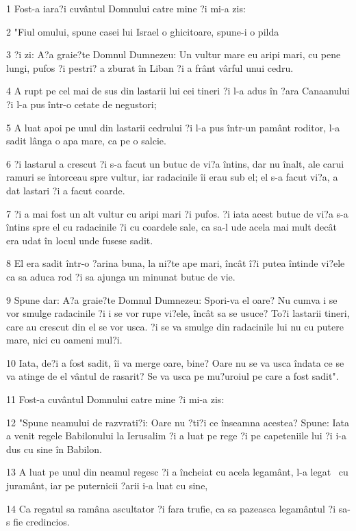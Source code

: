 \par 1 Fost-a iara?i cuvântul Domnului catre mine ?i mi-a zis:
\par 2 "Fiul omului, spune casei lui Israel o ghicitoare, spune-i o pilda
\par 3 ?i zi: A?a graie?te Domnul Dumnezeu: Un vultur mare eu aripi mari, cu pene lungi, pufos ?i pestri? a zburat în Liban ?i a frânt vârful unui cedru.
\par 4 A rupt pe cel mai de sus din lastarii lui cei tineri ?i l-a adus în ?ara Canaanului ?i l-a pus într-o cetate de negustori;
\par 5 A luat apoi pe unul din lastarii cedrului ?i l-a pus într-un pamânt roditor, l-a sadit lânga o apa mare, ca pe o salcie.
\par 6 ?i lastarul a crescut ?i s-a facut un butuc de vi?a întins, dar nu înalt, ale carui ramuri se întorceau spre vultur, iar radacinile îi erau sub el; el s-a facut vi?a, a dat lastari ?i a facut coarde.
\par 7 ?i a mai fost un alt vultur cu aripi mari ?i pufos. ?i iata acest butuc de vi?a s-a întins spre el cu radacinile ?i cu coardele sale, ca sa-l ude acela mai mult decât era udat în locul unde fusese sadit.
\par 8 El era sadit într-o ?arina buna, la ni?te ape mari, încât î?i putea întinde vi?ele ca sa aduca rod ?i sa ajunga un minunat butuc de vie.
\par 9 Spune dar: A?a graie?te Domnul Dumnezeu: Spori-va el oare? Nu cumva i se vor smulge radacinile ?i i se vor rupe vi?ele, încât sa se usuce? To?i lastarii tineri, care au crescut din el se vor usca. ?i se va smulge din radacinile lui nu cu putere mare, nici cu oameni mul?i.
\par 10 Iata, de?i a fost sadit, îi va merge oare, bine? Oare nu se va usca îndata ce se va atinge de el vântul de rasarit? Se va usca pe mu?uroiul pe care a fost sadit".
\par 11 Fost-a cuvântul Domnului catre mine ?i mi-a zis:
\par 12 "Spune neamului de razvrati?i: Oare nu ?ti?i ce înseamna acestea? Spune: Iata a venit regele Babilonului la Ierusalim ?i a luat pe rege ?i pe capeteniile lui ?i i-a dus cu sine în Babilon.
\par 13 A luat pe unul din neamul regesc ?i a încheiat cu acela legamânt, l-a legat  cu juramânt, iar pe puternicii ?arii i-a luat cu sine,
\par 14 Ca regatul sa ramâna ascultator ?i fara trufie, ca sa pazeasca legamântul ?i sa-s fie credincios.

